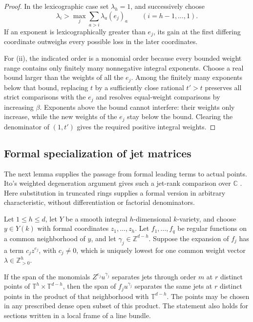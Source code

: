 \begin{proof}
In the lexicographic case set $\lambda_h=1$, and successively choose
\[
 \lambda_i>\max_j\sum_{a>i}\lambda_a(e_j)_a
 \qquad(i=h-1,\ldots,1).
\]
If an exponent is lexicographically greater than $e_j$, its gain at the first differing coordinate outweighs every possible loss in the later coordinates.

For (ii), the indicated order is a monomial order because every bounded weight range contains only finitely many nonnegative integral exponents. Choose a real bound larger than the weights of all the $e_j$.  Among the finitely many exponents below that bound, replacing $t$ by a sufficiently close rational $t'>t$ preserves all strict comparisons with the $e_j$ and resolves equal-weight comparisons by increasing $\beta$.  Exponents above the bound cannot interfere: their weights only increase, while the new weights of the $e_j$ stay below the bound.  Clearing the denominator of $(1,t')$ gives the required positive integral weights.
\end{proof}

\subsection{Formal specialization of jet matrices}

The next lemma supplies the passage from formal leading terms to actual points.  Ito's weighted degeneration argument gives such a jet-rank comparison over $\mathbb{C}$ \cite[Proposition~5.7]{Ito2013}.  Here substitution in truncated rings supplies a formal version in arbitrary characteristic, without differentiation or factorial denominators.

\begin{lemma}\label{lem:formal-transfer}
Let $1\leq h\leq d$, let $Y$ be a smooth integral $h$-dimensional $k$-variety, and choose $y\in Y(k)$ with formal coordinates $z_1,\ldots,z_h$.  Let $f_1,\ldots,f_q$ be regular functions on a common neighborhood of $y$, and let $\gamma_j\in\mathbb{Z}^{d-h}$. Suppose the expansion of $f_j$ has a term $c_jz^{e_j}$, with $c_j\neq0$, which is uniquely lowest for one common weight vector $\lambda\in\mathbb{Z}_{>0}^h$.

If the span of the monomials $Z^{e_j}u^{\gamma_j}$ separates jets through order $m$ at $r$ distinct points of $\mathbb{T}^h\times\mathbb{T}^{d-h}$, then the span of $f_ju^{\gamma_j}$ separates the same jets at $r$ distinct points in the product of that neighborhood with $\mathbb{T}^{d-h}$. The points may be chosen in any prescribed dense open subset of this product.  The statement also holds for sections written in a local frame of a line bundle.
\end{lemma}

